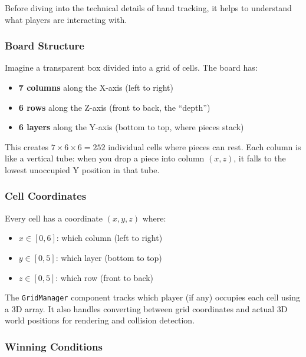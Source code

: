 \documentclass[11pt]{article}
\begin{document}
Before diving into the technical details of hand tracking, it helps to understand what players are interacting with.

\subsubsection{Board Structure}

Imagine a transparent box divided into a grid of cells. The board has:

\begin{itemize}
    \item \textbf{7 columns} along the X-axis (left to right)
    \item \textbf{6 rows} along the Z-axis (front to back, the ``depth'')
    \item \textbf{6 layers} along the Y-axis (bottom to top, where pieces stack)
\end{itemize}

This creates $7 \times 6 \times 6 = 252$ individual cells where pieces can rest. Each column is like a vertical tube: when you drop a piece into column $(x, z)$, it falls to the lowest unoccupied Y position in that tube.


\subsubsection{Cell Coordinates}

Every cell has a coordinate $(x, y, z)$ where:
\begin{itemize}
    \item $x \in [0, 6]$: which column (left to right)
    \item $y \in [0, 5]$: which layer (bottom to top)
    \item $z \in [0, 5]$: which row (front to back)
\end{itemize}

The \texttt{GridManager} component tracks which player (if any) occupies each cell using a 3D array. It also handles converting between grid coordinates and actual 3D world positions for rendering and collision detection.

\subsubsection{Winning Conditions}
\end{document}
